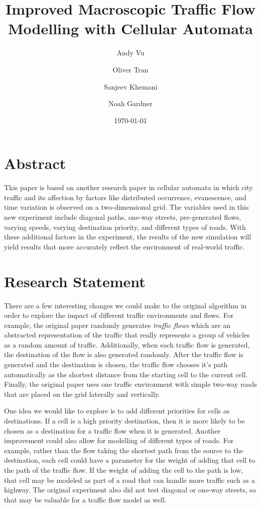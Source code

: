 \documentclass[12pt]{article}
\title{Improved Macroscopic Traffic Flow Modelling with Cellular Automata}
\author[1]{Andy Vu}
\author[1]{Oliver Tran}
\author[1]{Sanjeev Khemani}
\author[2]{Noah Gardner}
\affil[1]{College of Computing and Software Engineering, Kennesaw State University}
\date{\today}
\begin{document}
\maketitle
\section{Abstract}
This paper is based on another research paper in cellular automata in which city
traffic and its affection by factors like distributed occurrence, evanescence,
and time variation is observed on a two-dimensional grid. The variables used in
this new experiment include diagonal paths, one-way streets, pre-generated
flows, varying speeds, varying destination priority, and different types of
roads. With these additional factors in the experiment, the results of the new
simulation will yield results that more accurately reflect the environment of
real-world traffic.

\section{Research Statement}
There are a few interesting changes we could make to the original algorithm in
order to explore the impact of different traffic environments and flows. For
example, the original paper randomly generates \textit{traffic flows} which are
an abstracted representation of the traffic that really represents a group of
vehicles as a random amount of traffic. Additionally, when each traffic flow is
generated, the destination of the flow is also generated randomly. After the
traffic flow is generated and the destination is chosen, the traffic flow
chooses it's path automatically as the shortest distance from the starting cell
to the current cell. Finally, the original paper uses one traffic environment
with simple two-way roads that are placed on the grid laterally and vertically. 

One idea we would like to explore is to add different priorities for cells as
destinations. If a cell is a high priority destination, then it is more likely 
to be chosen as a destination for a traffic flow when it is generated. Another
improvement could also allow for modelling of different types of roads. For
example, rather than the flow taking the shortest path from the source to the
destination, each cell could have a parameter for the weight of adding that cell
to the path of the traffic flow. If the weight of adding the cell to the path is
low, that cell may be modeled as part of a road that can handle more traffic
such as a highway. The original experiment also did not test diagonal or one-way
streets, so that may be valuable for a traffic flow model as well.
\end{document}

